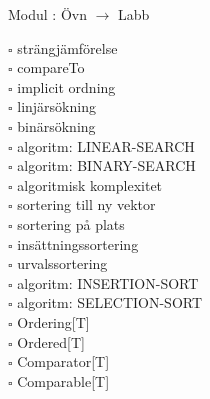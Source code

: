 
    Modul : Övn  $\rightarrow$ Labb 
    \begin{multicols}{3}\SlideFontTiny
    $\square$ strängjämförelse \\
$\square$ compareTo \\
$\square$ implicit ordning \\
$\square$ linjärsökning \\
$\square$ binärsökning \\
$\square$ algoritm: LINEAR-SEARCH \\
$\square$ algoritm: BINARY-SEARCH \\
$\square$ algoritmisk komplexitet \\
$\square$ sortering till ny vektor \\
$\square$ sortering på plats \\
$\square$ insättningssortering \\
$\square$ urvalssortering \\
$\square$ algoritm: INSERTION-SORT \\
$\square$ algoritm: SELECTION-SORT \\
$\square$ Ordering[T] \\
$\square$ Ordered[T] \\
$\square$ Comparator[T] \\
$\square$ Comparable[T] \\
    \end{multicols}
    